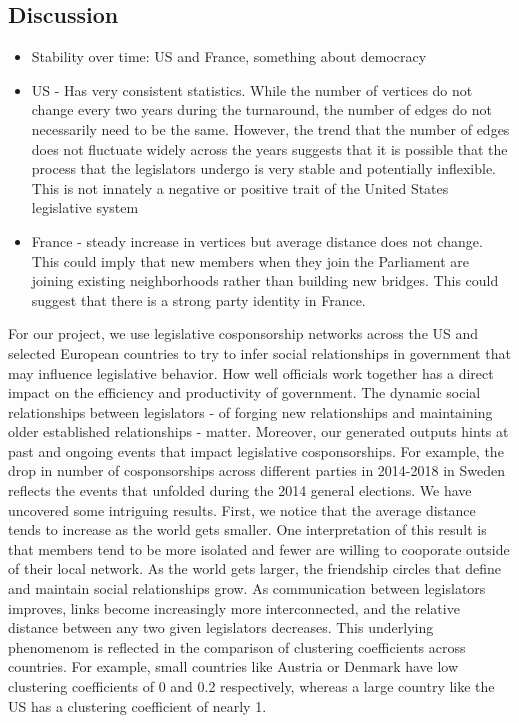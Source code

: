 \documentclass[12pt]{article}
\begin{document}
\begin{multicols*}{2}
\section{Discussion}
\begin{itemize}
  \item Stability over time: US and France, something about democracy
  \item US - Has very consistent statistics. While the number of vertices do not change every two years during the turnaround, the number of edges do not necessarily need to be the same. However, the trend that the number of edges does not fluctuate widely across the years suggests that it is possible that the process that the legislators undergo is very stable and potentially inflexible. This is not innately a negative or positive trait of the United States legislative system
  \item France - steady increase in vertices but average distance does not change. This could imply that new members when they join the Parliament are joining existing neighborhoods rather than building new bridges. This could suggest that there is a strong party identity in France.
\end{itemize}
For our project, we use legislative cosponsorship networks across the US and selected European countries to try to infer social relationships in government that may influence legislative behavior. How well officials work together has a direct impact on the efficiency and productivity of government. The dynamic social relationships between legislators - of forging new relationships and maintaining older established relationships - matter. Moreover, our generated outputs hints at past and ongoing events that impact legislative cosponsorships. For example, the drop in number of cosponsorships across different parties in 2014-2018 in Sweden reflects the events that unfolded during the 2014 general elections. 
We have uncovered some intriguing results. First, we notice that the average distance tends to increase as the world gets smaller. One interpretation of this result is that members tend to be more isolated and fewer are willing to cooporate outside of their local network. As the world gets larger, the friendship circles that define and maintain social relationships grow. As communication between legislators improves, links become increasingly more interconnected, and the relative distance between any two given legislators decreases. This underlying phenomenom is reflected in the comparison of clustering coefficients across countries. For example, small countries like Austria or Denmark have low clustering coefficients of 0 and 0.2 respectively, whereas a large country like the US has a clustering coefficient of nearly 1. 

\end{multicols*}
\end{document}
